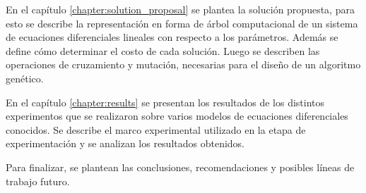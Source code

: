 En el capítulo \ref{chapter:solution_proposal} se plantea la solución propuesta, para esto se describe la representación en forma de árbol computacional de un sistema de ecuaciones diferenciales lineales con respecto a los parámetros. Además se define cómo determinar el costo de cada solución. Luego se describen las operaciones de cruzamiento y mutación, necesarias para el diseño de un algoritmo genético.

En el capítulo \ref{chapter:results} se presentan los resultados de los distintos experimentos que se realizaron sobre varios modelos de ecuaciones diferenciales conocidos. Se describe el marco experimental utilizado en la etapa de experimentación y se analizan los resultados obtenidos.

Para finalizar, se plantean las conclusiones, recomendaciones y posibles líneas de trabajo futuro.